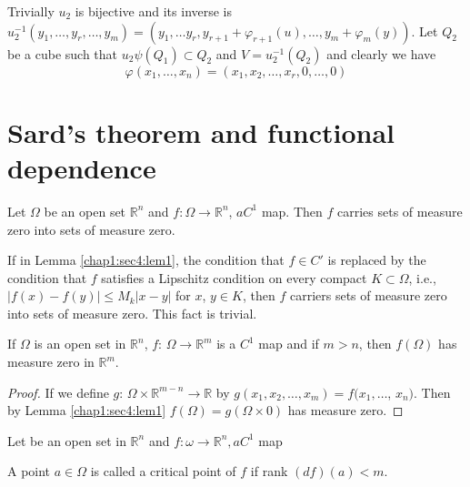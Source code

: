Trivially $u_2$ is bijective and its inverse is $u^{-1}_2 (y_1,
\ldots , y_r , \ldots , y_m) = (y_1, \ldots y_r, y_{ r  + 1} +
\varphi_{ r + 1} (u), \ldots ,y_m+ \varphi_m (y) )$. Let $Q_2$ be a cube such that
$u_2 \psi (Q_1) \subset Q_2$ and $V = u_2^{-1}(Q_2)$ and clearly we
have  
$$
\varphi (x_1, \ldots , x_n) = (x_1, x_2, \ldots, x_r, 0, \ldots, 0) 
$$

\section{Sard's theorem and functional dependence}\label{chap1:sec4} %

\setcounter{lemma}{0}
\begin{lemma}\label{chap1:sec4:lem1}%
Let $\Omega$ be an open set $\mathbb{R}^n$ and $f :\Omega \to
\mathbb{R}^n$, $a C^1$ map. Then $f$ carries sets of measure zero
into sets of measure zero. 
\end{lemma}

\begin{remark*}%
  If in Lemma \ref{chap1:sec4:lem1}, the condition that $f \in C'$ is replaced by the
  condition that $f$ satisfies a Lipschitz condition on every compact
  $K \subset \Omega$, i.e.,\pageoriginale $| f(x) - f (y) | \leq M_k |
  x - y|$ for 
  $x$, $y \in K$, then $f$ carriers sets of measure zero into sets of
  measure zero. This fact is trivial.  
\end{remark*}

\begin{lemma}\label{chap1:sec4:lem2}%
  If $\Omega$ is an open set in $\mathbb{R}^n$, $f$: $\Omega
  \to\mathbb{R}^m$ is a $C^1$ map and if  $m > n$, then $f (\Omega)$
  has measure zero in $\mathbb{R}^m$.  
\end{lemma}

\begin{proof}%
  If we define $g$: $\Omega \times \mathbb{R}^{ m - n} \to \mathbb{R}$
  by $ g (x_1, x_2, \ldots , x_m) = f (x_1, \ldots$, $x_n)$. Then by
  Lemma \ref{chap1:sec4:lem1} $f (\Omega) = g (\Omega \times 0)$  has measure zero.  
\end{proof}

Let be an open set in $\mathbb{R}^n$ and $f: \omega \to \mathbb{R}^n, a C^1$ map
\begin{defi*}%
  A point $a \in \Omega$ is called a critical point of $f$ if rank
  $(df)(a)< m$.  
\end{defi*}

